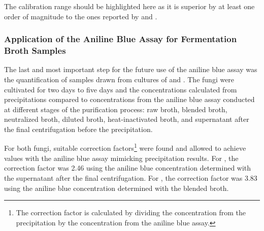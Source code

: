 The calibration range should be highlighted here as it is superior by at least one order of magnitude to the ones reported by \textcite{Nitschke2011} and \textcite{Ko2004}.

\subsubsection{Application of the Aniline Blue Assay for Fermentation Broth Samples}
The last and most important step for the future use of the aniline blue assay was the quantification of samples drawn from cultures of \rolf{} and \comm{}. The fungi were cultivated for two days to five days and the concentrations calculated from precipitations compared to concentrations from the aniline blue assay conducted at different stages of the purification process: raw broth, blended broth, neutralized broth, diluted broth, heat-inactivated broth, and supernatant after the final centrifugation before the precipitation.

For both fungi, suitable correction factors\footnote{The correction factor is calculated by dividing the concentration from the precipitation by the concentration from the aniline blue assay.} were found and allowed to achieve values with the aniline blue assay mimicking precipitation results. For \rolf{}, the correction factor was 2.46 using the aniline blue concentration determined with the supernatant after the final centrifugation. For \comm{}, the correction factor was 3.83 using the aniline blue concentration determined with the blended broth.

